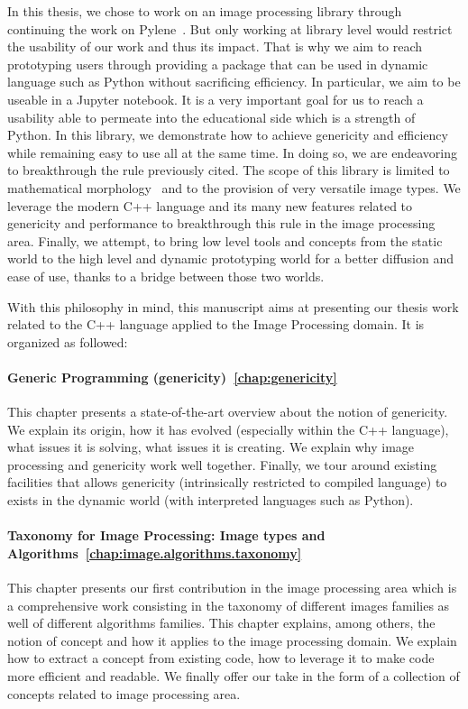 In this thesis, we chose to work on an image processing library through continuing the work on
Pylene~\parencite{carlinet.2018.pylena}. But only working at library level would restrict the usability of our work and
thus its impact. That is why we aim to reach prototyping users through providing a package that can be used in dynamic
language such as Python without sacrificing efficiency. In particular, we aim to be useable in a Jupyter notebook. It is
a very important goal for us to reach a usability able to permeate into the educational side which is a strength of
Python. In this library, we demonstrate how to achieve genericity and efficiency while remaining easy to use all at the
same time. In doing so, we are endeavoring to breakthrough the rule previously cited. The scope of this library is
limited to mathematical morphology~\parencite{najman.2013.mathematical,geraud.2010.book} and to the provision of very
versatile image types. We leverage the modern C++ language and its many new features related to genericity and
performance to breakthrough this rule in the image processing area. Finally, we attempt, to bring low level tools and
concepts from the static world to the high level and dynamic prototyping world for a better diffusion and ease of use,
thanks to a bridge between those two worlds.

With this philosophy in mind, this manuscript aims at presenting our thesis work related to the C++ language applied to
the Image Processing domain. It is organized as followed:

\paragraph{Generic Programming (genericity)~\ref{chap:genericity}} This chapter presents a state-of-the-art overview
about the notion of genericity. We explain its origin, how it has evolved (especially within the C++ language), what
issues it is solving, what issues it is creating. We explain why image processing and genericity work well together.
Finally, we tour around existing facilities that allows genericity (intrinsically restricted to compiled language) to
exists in the dynamic world (with interpreted languages such as Python).

\paragraph{Taxonomy for Image Processing: Image types and Algorithms~\ref{chap:image.algorithms.taxonomy}} This chapter
presents our first contribution in the image processing area which is a comprehensive work consisting in the taxonomy of
different images families as well of different algorithms families. This chapter explains, among others, the notion of
concept and how it applies to the image processing domain. We explain how to extract a concept from existing code, how
to leverage it to make code more efficient and readable. We finally offer our take in the form of a collection of
concepts related to image processing area.

